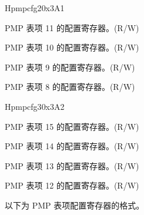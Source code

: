 \begin{register}{H}{pmpcfg2}{0x3A1}
\label{regdesc:pmpcfg2}%
%
%
%
%
\regnewline%
\begin{regdesc}
\begin{reglist}
\label{fielddesc:pmp11cfg}\item [pmp11cfg] PMP 表项 11 的配置寄存器。(R/W)\\
\label{fielddesc:pmp10cfg}\item [pmp10cfg] PMP 表项 10 的配置寄存器。(R/W)\\
\label{fielddesc:pmp9cfg}\item [pmp9cfg] PMP 表项 9 的配置寄存器。(R/W)\\
\label{fielddesc:pmp8cfg}\item [pmp8cfg] PMP 表项 8 的配置寄存器。(R/W)\\
\end{reglist}
\end{regdesc}
\end{register}

\begin{register}{H}{pmpcfg3}{0x3A2}
\label{regdesc:pmpcfg3}%
%
%
%
%
\regnewline%
\begin{regdesc}
\begin{reglist}
\label{fielddesc:pmp15cfg}\item [pmp15cfg] PMP 表项 15 的配置寄存器。(R/W)\\
\label{fielddesc:pmp14cfg}\item [pmp14cfg] PMP 表项 14 的配置寄存器。(R/W)\\
\label{fielddesc:pmp13cfg}\item [pmp13cfg] PMP 表项 13 的配置寄存器。(R/W)\\
\label{fielddesc:pmp12cfg}\item [pmp12cfg] PMP 表项 12 的配置寄存器。(R/W)\\
\end{reglist}
\end{regdesc}
\end{register}

以下为 PMP 表项配置寄存器的格式。

